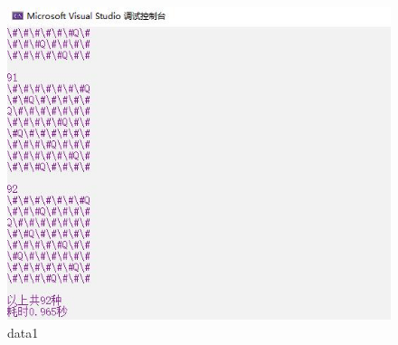 \documentclass[UTF8]{article}
\begin{document}
	\begin{figure}[H]
		\centering
		\includegraphics[scale=0.7]{data1.jpg}
		\caption{data1}
		\label{data1}
	\end{figure}\par
	
\end{document}

